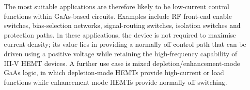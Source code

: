 \vspace{1mm}

The most suitable applications are therefore likely to be low-current control
functions within GaAs-based circuits. Examples include RF front-end enable
switches, bias-selection networks, signal-routing switches, isolation switches
and protection paths. In these applications, the device is not required to
maximise current density; its value lies in providing a normally-off control
path that can be driven using a positive voltage while retaining the
high-frequency capability of III-V HEMT devices. A further use case is mixed
depletion/enhancement-mode GaAs logic, in which depletion-mode HEMTs provide
high-current or load functions while enhancement-mode HEMTs provide normally-off
switching.
